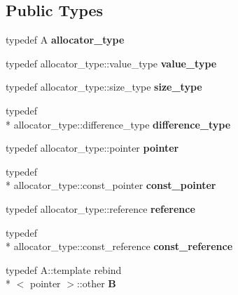 \subsection*{Public Types}
\begin{DoxyCompactItemize}
\item 
\hypertarget{classmy__deque_a34236f0fef930decd11dc683f40a38be}{typedef A {\bfseries allocator\-\_\-type}}\label{classmy__deque_a34236f0fef930decd11dc683f40a38be}

\item 
\hypertarget{classmy__deque_ae9c156c405acc57623a4601ce755596f}{typedef allocator\-\_\-type\-::value\-\_\-type {\bfseries value\-\_\-type}}\label{classmy__deque_ae9c156c405acc57623a4601ce755596f}

\item 
\hypertarget{classmy__deque_a61e5e5317fe72a381ce4d45f09544b02}{typedef allocator\-\_\-type\-::size\-\_\-type {\bfseries size\-\_\-type}}\label{classmy__deque_a61e5e5317fe72a381ce4d45f09544b02}

\item 
\hypertarget{classmy__deque_ac85676cb2492fbc9bbc6f1a30e9d3c73}{typedef \\*
allocator\-\_\-type\-::difference\-\_\-type {\bfseries difference\-\_\-type}}\label{classmy__deque_ac85676cb2492fbc9bbc6f1a30e9d3c73}

\item 
\hypertarget{classmy__deque_a58e82fc365a3b086367479515e1515be}{typedef allocator\-\_\-type\-::pointer {\bfseries pointer}}\label{classmy__deque_a58e82fc365a3b086367479515e1515be}

\item 
\hypertarget{classmy__deque_a8fea5edeb2b2cf3dd1246dc3abf9b71b}{typedef \\*
allocator\-\_\-type\-::const\-\_\-pointer {\bfseries const\-\_\-pointer}}\label{classmy__deque_a8fea5edeb2b2cf3dd1246dc3abf9b71b}

\item 
\hypertarget{classmy__deque_a4c34c14f397b7676445b37c87003116b}{typedef allocator\-\_\-type\-::reference {\bfseries reference}}\label{classmy__deque_a4c34c14f397b7676445b37c87003116b}

\item 
\hypertarget{classmy__deque_ad50d8b378580088cf77fa43f0640e49c}{typedef \\*
allocator\-\_\-type\-::const\-\_\-reference {\bfseries const\-\_\-reference}}\label{classmy__deque_ad50d8b378580088cf77fa43f0640e49c}

\item 
\hypertarget{classmy__deque_a1a55c016646bba79086d90d3cccde143}{typedef A\-::template rebind\\*
$<$ pointer $>$\-::other {\bfseries B}}\label{classmy__deque_a1a55c016646bba79086d90d3cccde143}

\end{DoxyCompactItemize}
